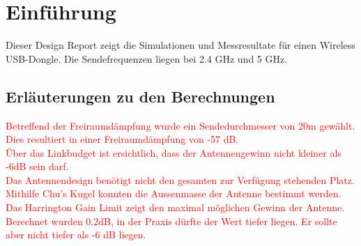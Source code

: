 \section{Einführung}
Dieser Design Report zeigt die Simulationen und Messresultate für einen Wireless USB-Dongle. Die Sendefrequenzen liegen bei 2.4 GHz und 5 GHz.

\subsection{Erläuterungen zu den Berechnungen}
\textcolor{red}{Betreffend der Freiraumdämpfung wurde ein Sendedurchmesser von 20m gewählt. Dies resultiert in einer Freiraumdämpfung von -57 dB.\\Über das Linkbudget ist ersichtlich, dass der Antennengewinn nicht kleiner als -6dB sein darf.\\Das Antennendesign benötigt nicht den gesamten zur Verfügung stehenden Platz. Mithilfe Chu's Kugel konnten die Aussenmasse der Antenne bestimmt werden. Das Harrington Gain Limit zeigt den maximal möglichen Gewinn der Antenne. Berechnet wurden 0.2dB, in der Praxis dürfte der Wert tiefer liegen. Er sollte aber nicht tiefer als -6 dB liegen.}



